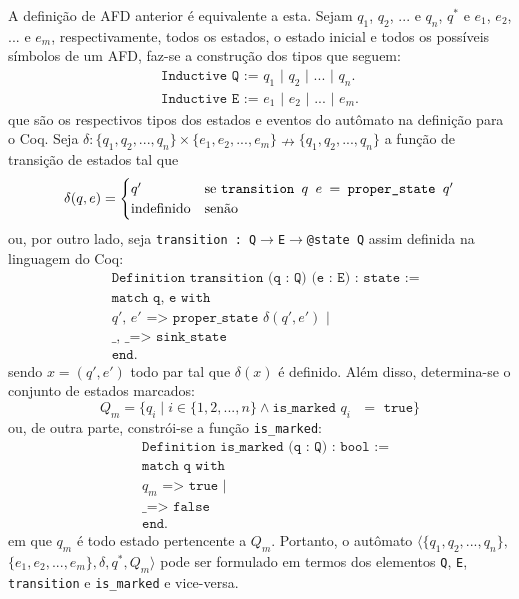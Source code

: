 A definição de AFD anterior é equivalente a esta. Sejam $q_1$, $q_2$, $...$ e $q_n$, $q^*$ e $e_1$, $e_2$, $...$ e $e_m$, respectivamente, todos os estados, o estado inicial e todos os possíveis símbolos de um AFD, faz-se a construção dos tipos que seguem: \begin{gather*}\texttt{Inductive Q := $q_1$ | $q_2$ | $...$ | $q_n$.}\\ \texttt{Inductive E := $e_1$ | $e_2$ | $...$ | $e_m$.}\end{gather*} que são os respectivos tipos dos estados e eventos do autômato na definição para o Coq. Seja $\delta : \{ q_1, q_2, ..., q_n \} \times \{ e_1, e_2, ..., e_m \} \nrightarrow \{ q_1, q_2, ..., q_n \}$ a função de transição de estados tal que $$\delta(q, e) = \begin{cases}
q' & \text{se \texttt{transition $q$ $e$ $=$ proper\_state $q'$}}\\
\text{indefinido} & \text{senão}
\end{cases}$$ ou, por outro lado, seja \texttt{transition : Q$\to$E$\to$@state Q} assim definida na linguagem do Coq: 	\begin{align*}
&\texttt{Definition transition (q : Q) (e : E) : state :=}\\
&\texttt{match q, e with}\\
&\texttt{$q'$, $e'$ => proper\_state $\delta(q', e')$ |}\\
&\texttt{\_, \_ => sink\_state}\\
&\texttt{end.}
\end{align*} sendo $x = (q',e')$ todo par tal que $\delta(x)$ é definido. Além disso, determina-se o conjunto de estados marcados: $$Q_m = \{ q_i \mid i \in \{ 1, 2, ..., n \} \wedge \texttt{is\_marked $q_i$ $=$ true} \}$$ ou, de outra parte, constrói-se a função \texttt{is\_marked}: \begin{align*}
&\texttt{Definition is\_marked (q : Q) : bool :=}\\
&\texttt{match q with}\\
&\texttt{$q_m$ => true |}\\
&\texttt{\_ => false}\\
&\texttt{end.}
\end{align*} em que $q_m$ é todo estado pertencente a $Q_m$. Portanto, o autômato $\langle \{ q_1, q_2, ..., q_n \},$ $\{ e_1, e_2, ..., e_m \}, \delta, q^*, Q_m \rangle$ pode ser formulado em termos dos elementos \texttt{Q}, \texttt{E}, \texttt{transition} e \texttt{is\_marked} e vice-versa.

